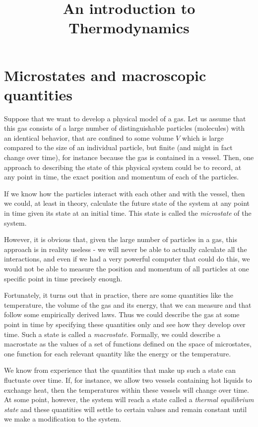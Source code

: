 \documentclass[a4paper, draft]{report}
\title{An introduction to Thermodynamics}
\numberwithin{section}{chapter}
\numberwithin{equation}{chapter}
\theoremstyle{own}
\theoremstyle{remark}
\begin{document}
\maketitle

\tableofcontents


\section{Microstates and macroscopic quantities}

Suppose that we want to develop a physical model of a gas. Let us assume that this gas consists of a large number of distinguishable particles (molecules) with an identical behavior, that are confined to some volume $V$ which is large compared to the size of an individual particle, but finite (and might in fact change over time), for instance because the gas is contained in a vessel. Then, one approach to describing the state of this physical system could be to record, at any point in time, the exact position and momentum of each of the particles.

If we know how the particles interact with each other and with the vessel, then we could, at least in theory, calculate the future state of the system at any point in time given its state at an initial time. This state is called the {\em microstate} of the system.

However, it is obvious that, given the large number of particles in a gas, this approach is in reality useless - we will never be able to actually calculate all the interactions, and even if we had a very powerful computer that could do this, we would not be able to measure the position and momentum of all particles at one specific point in time precisely enough. 

Fortunately, it turns out that in practice, there are some quantities like the temperature, the volume of the gas and its energy, that we can measure and that follow some empirically derived laws. Thus we could describe the gas at some point in time by specifying these quantities only and see how they develop over time. Such a state is called a {\em macrostate}. Formally, we could describe a macrostate as the values of a set of functions defined on the space of microstates, one function for each relevant quantity like the energy or the temperature. 

We know from experience that the quantities that make up such a state can fluctuate over time. If, for instance, we allow two vessels containing hot liquids to exchange heat, then the temperatures within these vessels will change over time. At some point, however, the system will reach a state called a {\em thermal equilibrium state} and these quantities will settle to certain values and remain constant until we make a modification to the system.
\end{document}
